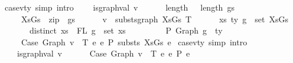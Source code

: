 \begin{isabellebody}
{\isacharbar}{\kern0pt}\ case{}{\isacharunderscore}{\kern0pt}v{\isacharunderscore}{\kern0pt}ty\ {\isacharbrackleft}{\kern0pt}simp{\isacharcomma}{\kern0pt}\ intro{\isacharbrackright}{\kern0pt}{\isacharcolon}{\kern0pt}\isanewline
\ \ \ \ {\isachardoublequoteopen}is{\isacharunderscore}{\kern0pt}graph{\isacharunderscore}{\kern0pt}val\ v\ {\isacharequal}{\kern0pt}{\isacharequal}{\kern0pt}{\isachargreater}{\kern0pt}\isanewline
\ \ \ \ \ length\ {\isasymGamma}\ {\isacharequal}{\kern0pt}\ length\ gs\ {\isacharequal}{\kern0pt}{\isacharequal}{\kern0pt}{\isachargreater}{\kern0pt}\isanewline
\ \ \ \ \ XsGs\ {\isacharequal}{\kern0pt}\ zip\ {\isasymGamma}\ gs\ {\isacharequal}{\kern0pt}{\isacharequal}{\kern0pt}{\isachargreater}{\kern0pt}\isanewline
\ \ \ \ \ v\ {\isasymsimeq}\ substs{\isacharunderscore}{\kern0pt}graph\ XsGs\ T\ {\isacharequal}{\kern0pt}{\isacharequal}{\kern0pt}{\isachargreater}{\kern0pt}\isanewline
\ \ \ \ \ {\isasymforall}{\isacharparenleft}{\kern0pt}{\isacharparenleft}{\kern0pt}xs{\isacharcomma}{\kern0pt}\ ty{\isacharparenright}{\kern0pt}{\isacharcomma}{\kern0pt}\ g{\isacharparenright}{\kern0pt}\ {\isasymin}\ set\ XsGs{\isachardot}{\kern0pt}\ {\isacharparenleft}{\kern0pt}\isanewline
\ \ \ \ \ \ \ distinct\ xs\ {\isasymand}\ FL\ g\ {\isacharequal}{\kern0pt}\ set\ xs\ {\isasymand}\isanewline
\ \ \ \ \ \ \ {\isacharbrackleft}{\kern0pt}{\isacharbrackright}{\kern0pt}\ {\isasymturnstile}{\isacharbraceleft}{\kern0pt}P{\isacharbraceright}{\kern0pt}\ {\isacharparenleft}{\kern0pt}Graph\ g{\isacharparenright}{\kern0pt}\ {\isacharcolon}{\kern0pt}\ ty\isanewline
\ \ \ \ \ {\isacharparenright}{\kern0pt}\ {\isacharequal}{\kern0pt}{\isacharequal}{\kern0pt}{\isachargreater}{\kern0pt}\isanewline
\ \ \ \ \ Case\ {\isacharparenleft}{\kern0pt}Graph\ v{\isacharparenright}{\kern0pt}\ {\isasymGamma}\ T\ e{}\ e{}\ {\isacharminus}{\kern0pt}{\isachargreater}{\kern0pt}{\isacharbraceleft}{\kern0pt}P{\isacharbraceright}{\kern0pt}\ substs\ XsGs\ e{}{\isachardoublequoteclose}\isanewline
{\isacharbar}{\kern0pt}\ case{}{\isacharunderscore}{\kern0pt}v{\isacharunderscore}{\kern0pt}ty\ {\isacharbrackleft}{\kern0pt}simp{\isacharcomma}{\kern0pt}\ intro{\isacharbrackright}{\kern0pt}{\isacharcolon}{\kern0pt}\isanewline
\ \ \ \ {\isachardoublequoteopen}is{\isacharunderscore}{\kern0pt}graph{\isacharunderscore}{\kern0pt}val\ v\ {\isacharequal}{\kern0pt}{\isacharequal}{\kern0pt}{\isachargreater}{\kern0pt}\isanewline
\ \ \ \ \ Case\ {\isacharparenleft}{\kern0pt}Graph\ v{\isacharparenright}{\kern0pt}\ {\isasymGamma}\ T\ e{}\ e{}\ {\isacharminus}{\kern0pt}{\isachargreater}{\kern0pt}{\isacharbraceleft}{\kern0pt}P{\isacharbraceright}{\kern0pt}\ e{}{\isachardoublequoteclose}\isanewline

\end{isabellebody}
